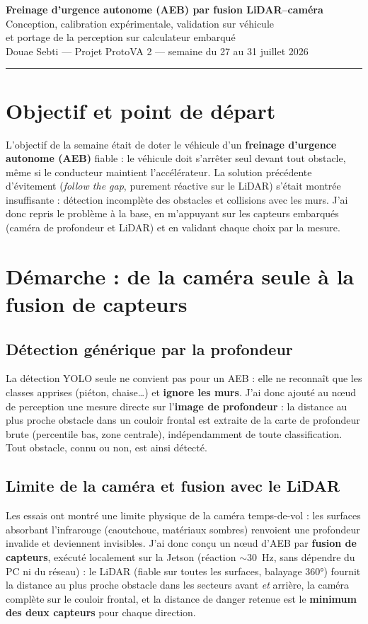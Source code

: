 \documentclass[11pt,a4paper]{article}
\begin{document}
\begin{center}
{\color{problue}\Large\bfseries Freinage d'urgence autonome (AEB) par fusion LiDAR--caméra}\\[4pt]
{\large Conception, calibration expérimentale, validation sur véhicule\\et portage de la perception sur calculateur embarqué}\\[8pt]
{\color{progray} Douae Sebti — Projet ProtoVA 2 — semaine du 27 au 31 juillet 2026}
\end{center}
\vspace{2pt}
\hrule
\vspace{10pt}

\section{Objectif et point de départ}
L'objectif de la semaine était de doter le véhicule d'un \textbf{freinage d'urgence
autonome (AEB)} fiable : le véhicule doit s'arrêter seul devant tout obstacle, même
si le conducteur maintient l'accélérateur. La solution précédente d'évitement
(\emph{follow the gap}, purement réactive sur le LiDAR) s'était montrée
insuffisante : détection incomplète des obstacles et collisions avec les murs.
J'ai donc repris le problème à la base, en m'appuyant sur les capteurs embarqués
(caméra de profondeur et LiDAR) et en validant chaque choix par la mesure.

\section{Démarche : de la caméra seule à la fusion de capteurs}
\subsection{Détection générique par la profondeur}
La détection YOLO seule ne convient pas pour un AEB : elle ne reconnaît que les
classes apprises (piéton, chaise\ldots) et \textbf{ignore les murs}. J'ai donc ajouté
au nœud de perception une mesure directe sur l'\textbf{image de profondeur} : la
distance au plus proche obstacle dans un couloir frontal est extraite de la carte de
profondeur brute (percentile bas, zone centrale), indépendamment de toute
classification. Tout obstacle, connu ou non, est ainsi détecté.

\subsection{Limite de la caméra et fusion avec le LiDAR}
Les essais ont montré une limite physique de la caméra temps-de-vol : les surfaces
absorbant l'infrarouge (caoutchouc, matériaux sombres) renvoient une profondeur
invalide et deviennent invisibles. J'ai donc conçu un nœud d'AEB par
\textbf{fusion de capteurs}, exécuté localement sur la Jetson (réaction $\sim$30~Hz,
sans dépendre du PC ni du réseau) : le LiDAR (fiable sur toutes les surfaces,
balayage 360°) fournit la distance au plus proche obstacle dans les secteurs avant
\emph{et} arrière, la caméra complète sur le couloir frontal, et la distance de
danger retenue est le \textbf{minimum des deux capteurs} pour chaque direction.
\end{document}

